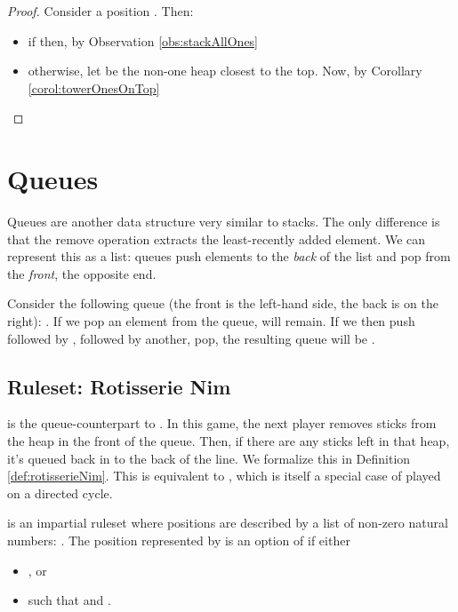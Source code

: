 \documentclass[letter,10pt]{article}
\begin{document}
\begin{proof}
    Consider a  position .  Then:
    \begin{itemize}
        \item if  then, by Observation \ref{obs:stackAllOnes} 
\item otherwise, let  be the non-one heap closest to the top.  Now, by Corollary \ref{corol:towerOnesOnTop} 
    \end{itemize}
\end{proof}

\section{Queues}
\label{section:queues}

Queues are another data structure very similar to stacks.  The only difference is that the remove operation extracts the least-recently added element.  We can represent this as a list:
queues push elements to the \emph{back} of the list and pop from the \emph{front}, the opposite end.

Consider the following queue (the front is the left-hand side, the back is on the right): .  If we pop an element from the queue,  will remain.  If we then push  followed by , followed by another, pop, the resulting queue will be .

\subsection{Ruleset: Rotisserie Nim}

 is the queue-counterpart to .  In this game, the next player removes sticks from the heap in the front of the queue.  Then, if there are any sticks left in that heap, it's queued back in to the back of the line.  We formalize this in Definition \ref{def:rotisserieNim}. This is equivalent to , which is itself a special case of  played on a directed cycle\cite{DBLP:journals/tcs/DucheneR14}. 



\begin{definition}
	\label{def:rotisserieNim}
	 is an impartial ruleset where positions are described by a list of non-zero natural numbers: .  The position represented by  is an option of  if either
	\begin{itemize}
		\item  , or
		\item   such that  and .
	\end{itemize}
\end{definition}
\end{document}
